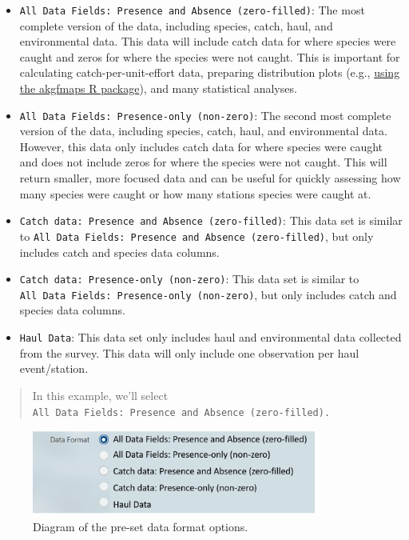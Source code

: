 \documentclass[
  letterpaper,
  oneside,
  open=any]{scrbook}
\providecommand{\tightlist}{%
  \setlength{\itemsep}{0pt}\setlength{\parskip}{0pt}}\usepackage{longtable,booktabs,array}
\begin{document}
\begin{itemize}
\tightlist
\item
  \texttt{All\ Data\ Fields:\ Presence\ and\ Absence\ (zero-filled)}:
  The most complete version of the data, including species, catch, haul,
  and environmental data. This data will include catch data for where
  species were caught and zeros for where the species were not caught.
  This is important for calculating catch-per-unit-effort data,
  preparing distribution plots (e.g.,
  \href{https://github.com/afsc-gap-products/akgfmaps}{using the
  akgfmaps R package}), and many statistical analyses.
\item
  \texttt{All\ Data\ Fields:\ Presence-only\ (non-zero)}: The second
  most complete version of the data, including species, catch, haul, and
  environmental data. However, this data only includes catch data for
  where species were caught and does not include zeros for where the
  species were not caught. This will return smaller, more focused data
  and can be useful for quickly assessing how many species were caught
  or how many stations species were caught at.
\item
  \texttt{Catch\ data:\ Presence\ and\ Absence\ (zero-filled)}: This
  data set is similar to
  \texttt{All\ Data\ Fields:\ Presence\ and\ Absence\ (zero-filled)},
  but only includes catch and species data columns.
\item
  \texttt{Catch\ data:\ Presence-only\ (non-zero)}: This data set is
  similar to \texttt{All\ Data\ Fields:\ Presence-only\ (non-zero)}, but
  only includes catch and species data columns.
\item
  \texttt{Haul\ Data}: This data set only includes haul and
  environmental data collected from the survey. This data will only
  include one observation per haul event/station.
\end{itemize}

\begin{quote}
In this example, we'll select
\texttt{All\ Data\ Fields:\ Presence\ and\ Absence\ (zero-filled).}
\end{quote}

\begin{figure}

{\centering \includegraphics[width=3.68in,height=\textheight]{content/../img/foss_4_data_format.png}

}

\caption{Diagram of the pre-set data format options.}

\end{figure}
\end{document}
